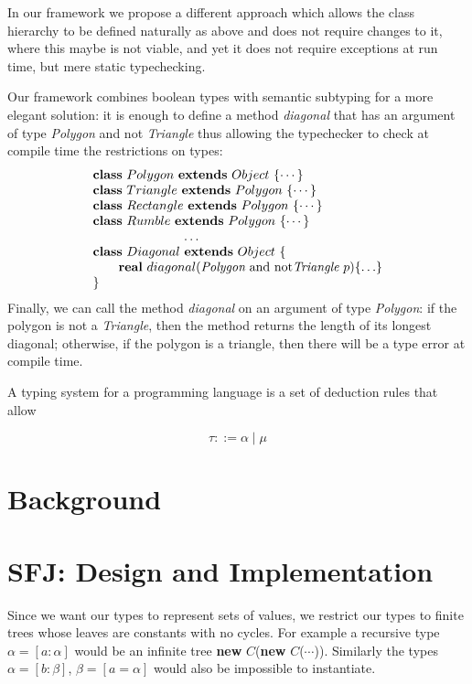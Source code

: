\documentclass[runningheads]{llncs}
\begin{document}
\begin{example}
In our framework we propose a different approach which allows the class hierarchy to be defined naturally as above and does not require changes to it, where this maybe is not viable, and yet it does not require exceptions at run time, but mere static typechecking.

Our framework combines boolean types with semantic subtyping for a more elegant solution: it is enough to define a method \emph{diagonal} that has an argument of type \emph{Polygon} and not \emph{Triangle} thus allowing the typechecker to check at compile time the restrictions on types:
$$
\begin{array}{l}
\mathbf{class} \  Polygon \ \mathbf{extends }\  Object\ \{\cdots\}
\\
\mathbf{class} \  Triangle \ \mathbf{extends }\  Polygon\ \{\cdots\}
\\
\mathbf{class} \  Rectangle \ \mathbf{extends }\  Polygon\ \{\cdots\}
\\
\mathbf{class} \  Rumble \ \mathbf{extends }\  Polygon\ \{\cdots\}
\\
\hspace{2.5cm} \ldots
\\
\mathbf{class} \  Diagonal \ \mathbf{extends }\  Object\ \{
	\\
	\qquad \mathbf{real}\ diagonal(\textit{Polygon} \text{ and not}  \textit{Triangle} \ p)\{\ldots\}
	\\
\}
\end{array}
$$
Finally,  we can call the method \emph{diagonal} on an argument of type \emph{Polygon}: if the polygon is not a \emph{Triangle}, then the method returns the length of its longest diagonal; otherwise, if the polygon is a triangle, then there will be a type error at compile time.
\end{example}


A typing system for a programming language is a set of deduction rules that allow 

\begin{equation}
    \tau ::= \alpha \mid \mu
\end{equation}

\section{Background}

\section{SFJ: Design and Implementation}

Since we want our types to represent sets of values, we restrict our types to finite trees whose 
leaves are constants with no cycles. For example a recursive type $\alpha = [a : \alpha]$ would
be an infinite tree \textbf{new} $C$(\textbf{new} $C$($\cdots{}$)). Similarly the types $\alpha = 
[b: \beta]$, $\beta = [a = \alpha]$ would also be impossible to instantiate. 
\end{document}
